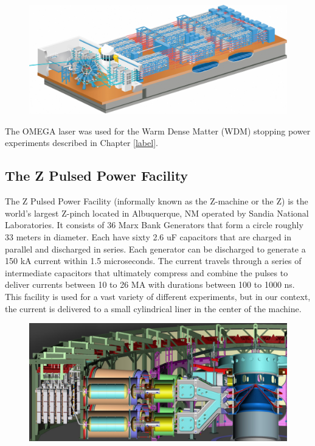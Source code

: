 	
	\begin{figure}[h!]
		\centering
		\includegraphics[scale=0.3]{Figures/omega60.pdf}
		\caption{ \cite{bibid}}
	\end{figure}

	The OMEGA laser was used for the Warm Dense Matter (WDM) stopping power experiments described in Chapter \ref{label}.
	
	
	
	
\subsection{The Z Pulsed Power Facility}
\label{sec:ZMachine}

The Z Pulsed Power Facility (informally known as the Z-machine or the Z) is the world's largest Z-pinch located in Albuquerque, NM operated by Sandia National Laboratories. It consists of 36 Marx Bank Generators that form a circle roughly 33 meters in diameter. Each have sixty 2.6 uF capacitors that are charged in parallel and discharged in series. Each generator can be discharged to generate a 150 kA current within 1.5 microseconds. The current travels through a series of intermediate capacitors that ultimately compress and combine the pulses to deliver currents between 10 to 26 MA with durations between 100 to 1000 ns. This facility is used for a vast variety of different experiments, but in our context, the current is delivered to a small cylindrical liner in the center of the machine. 

\begin{figure}[h!]
	\centering
	\includegraphics[scale=0.5]{Figures/zMachine.pdf}
	\caption{ \cite{bibid}}
\end{figure}

